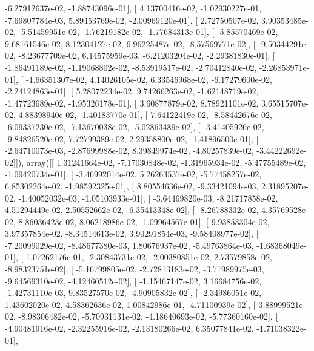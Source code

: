 \documentclass{article}
\begin{document}
         -6.27912637e-02,  -1.88743096e-01],
       [  4.13700416e-02,  -1.02930227e-01,  -7.69807784e-03,
          5.89453769e-02,  -2.00969120e-01],
       [  2.72750507e-02,   3.90353485e-02,  -5.51459951e-02,
         -1.76219182e-02,  -1.77684313e-01],
       [ -5.85570469e-02,   9.68161546e-02,   8.12304127e-02,
          9.96225487e-02,  -8.57569771e-02],
       [ -9.50344291e-02,  -8.23677709e-02,   6.14575959e-03,
         -6.21203204e-02,  -2.29381830e-01],
       [ -1.86491189e-02,  -1.19068802e-02,  -8.53919517e-02,
         -2.70412840e-02,  -2.26853971e-01],
       [ -1.66351307e-02,   4.14026105e-02,   6.33546968e-02,
         -6.17279600e-02,  -2.24124863e-01],
       [  5.28072234e-02,   9.74266263e-02,  -1.62148719e-02,
         -1.47723689e-02,  -1.95326178e-01],
       [  3.60877879e-02,   8.78921101e-02,   3.65515707e-02,
          4.88398940e-02,  -1.40183770e-01],
       [  7.64122419e-02,  -8.58442676e-02,  -6.09337230e-02,
         -7.13670038e-02,  -5.02863489e-02],
       [ -3.41405926e-02,  -9.84826520e-02,   7.72799389e-02,
          2.29358800e-02,  -1.41896500e-01],
       [ -2.64710073e-03,  -2.87699988e-02,   8.39849974e-02,
         -4.80257839e-02,  -3.44222692e-02]]), array([[  1.31241664e-02,  -7.17030848e-02,  -1.31965934e-02,
         -5.47755489e-02,  -1.09420734e-01],
       [ -3.46992014e-02,   5.26263537e-02,  -5.77458257e-02,
          6.85302264e-02,  -1.98592325e-01],
       [  8.80554636e-02,  -9.33421094e-03,   2.31895207e-02,
         -1.40052032e-03,  -1.05103933e-01],
       [ -3.64469820e-03,  -8.21717858e-02,   4.51294449e-02,
          2.50552662e-02,  -6.35413348e-02],
       [ -8.26788332e-02,   4.35769528e-02,   8.86036423e-02,
          8.06218986e-02,  -1.09964567e-01],
       [  9.93853304e-02,   3.97357854e-02,  -8.34514613e-02,
          3.90291854e-03,  -9.58408977e-02],
       [ -7.20099029e-02,  -8.48677380e-03,   1.80676937e-02,
         -5.49763864e-03,  -1.68368049e-01],
       [  1.07262176e-01,  -2.30843731e-02,  -2.00380851e-02,
          2.73579858e-02,  -8.98323751e-02],
       [ -5.16799805e-02,  -2.72813183e-02,  -3.71989975e-03,
         -9.64569310e-02,  -4.12460512e-02],
       [ -1.15467147e-02,   3.16684756e-02,  -1.42731110e-03,
          9.83527570e-02,  -4.90905832e-02],
       [ -2.34986051e-02,   1.43602020e-02,   4.58362636e-02,
          1.00842986e-01,  -4.71100939e-02],
       [  3.88999521e-02,  -8.98306482e-02,  -5.70931131e-02,
         -4.18640693e-02,  -5.77360160e-02],
       [ -4.90481916e-02,  -2.32255916e-02,  -2.13180266e-02,
          6.35077841e-02,  -1.71038322e-01],
\end{document}
